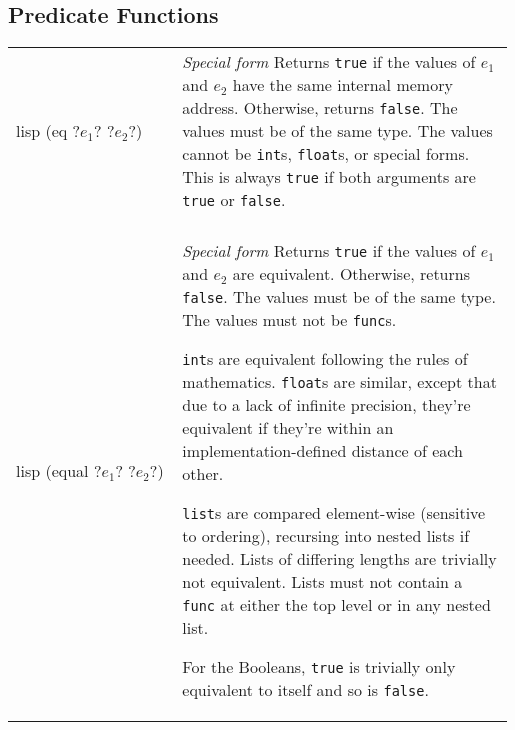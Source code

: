 \documentclass[a4paper, 12pt]{article}
\makeatletter
\newenvironment{funcdefs}
    {\begin{longtable}{@{} x{0.33\linewidth} @{} >{\raggedright\arraybackslash}p{0.66\linewidth} @{}}}
    {\end{longtable}}
\def\specialf/{\textit{Special form}\hspace{0.5em}}
\makeatother
\begin{document}
\subsection{Predicate Functions}
\begin{funcdefs}
    \begin{minipage}[t]{\linewidth}
        \centering
        \begin{cminted}[autogobble=true, escapeinside=??]{lisp}
            (eq ?$e_1$? ?$e_2$?)
        \end{cminted}
    \end{minipage}
    & \specialf/ Returns \texttt{true} if the values of $e_1$ and $e_2$ have the same internal memory address. Otherwise, returns \texttt{false}. The values must be of the same type. The values cannot be \texttt{int}s, \texttt{float}s, or special forms. This is always \texttt{true} if both arguments are \texttt{true} or \texttt{false}.
    \\ \\
    \begin{minipage}[t]{\linewidth}
        \centering
        \begin{cminted}[autogobble=true, escapeinside=??]{lisp}
            (equal ?$e_1$? ?$e_2$?)
        \end{cminted}
    \end{minipage}
    & \specialf/ Returns \texttt{true} if the values of $e_1$ and $e_2$ are equivalent. Otherwise, returns \texttt{false}. The values must be of the same type. The values must not be \texttt{func}s.
    \setlength{\parindent}{1.5em}%
    \par\indent%
    \texttt{int}s are equivalent following the rules of mathematics. \texttt{float}s are similar, except that due to a lack of infinite precision, they're equivalent if they're within an implementation-defined distance of each other.
    \par\indent%
    \texttt{list}s are compared element-wise (sensitive to ordering), recursing into nested lists if needed. Lists of differing lengths are trivially not equivalent. Lists must not contain a \texttt{func} at either the top level or in any nested list.
    \par\indent%
    For the Booleans, \texttt{true} is trivially only equivalent to itself and so is \texttt{false}.
\end{funcdefs}
\end{document}
